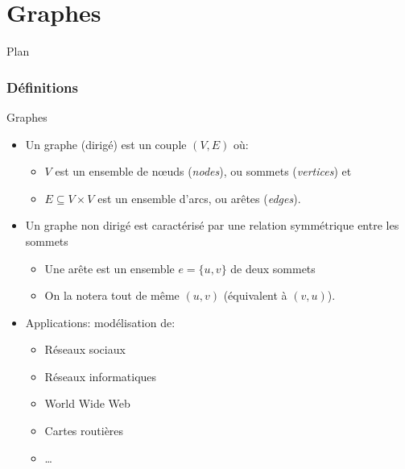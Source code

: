 \part{Graphes}

\begin{frame}{Plan}

\tableofcontents

\end{frame}

\section{Définitions}

\begin{frame}{Graphes}

\begin{itemize}
\item Un \alert{graphe (dirigé)}  est un couple $(V,E)$ où:
\begin{itemize}
\item $V$ est un ensemble de n\oe uds ({\it nodes}), ou sommets ({\it vertices}) et
\item $E\subseteq V\times V$ est un ensemble d'arcs, ou arêtes ({\it edges}).
\end{itemize}
\item Un graphe \alert{non dirigé} est caractérisé par une relation symmétrique entre les sommets
\begin{itemize}
\item Une arête est un ensemble $e=\{u,v\}$ de deux sommets
\item On la notera tout de même $(u,v)$ (équivalent à $(v,u)$). 
\end{itemize}

\item Applications: modélisation de:
\begin{itemize}
\item Réseaux sociaux
\item Réseaux informatiques
\item World Wide Web
\item Cartes routières
\item \ldots
\end{itemize}
\end{itemize}

\end{frame}

